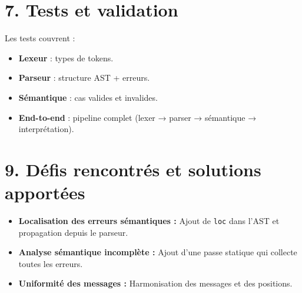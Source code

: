 \documentclass[11pt,a4paper]{article}
\begin{document}
\section*{7. Tests et validation}
Les tests couvrent :
\begin{itemize}[leftmargin=1.2cm]
  \item \textbf{Lexeur} : types de tokens.
  \item \textbf{Parseur} : structure AST + erreurs.
  \item \textbf{Sémantique} : cas valides et invalides.
  \item \textbf{End-to-end} : pipeline complet (lexer → parser → sémantique → interprétation).
\end{itemize}

\section*{9. Défis rencontrés et solutions apportées}
\begin{itemize}[leftmargin=1.2cm]
  \item \textbf{Localisation des erreurs sémantiques :}
  \newline Ajout de \texttt{loc} dans l’AST et propagation depuis le parseur.
  \item \textbf{Analyse sémantique incomplète :}
  \newline Ajout d’une passe statique qui collecte toutes les erreurs.
  \item \textbf{Uniformité des messages :}
  \newline Harmonisation des messages et des positions.
\end{itemize}
\end{document}
